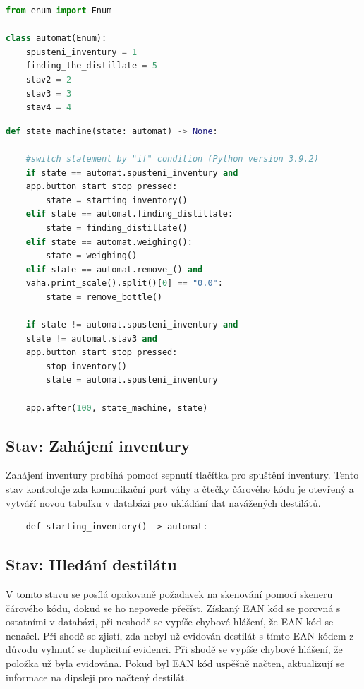 \begin{lstlisting}[language=Python, caption=Hlavní okno, frame=single]
from enum import Enum

class automat(Enum):
    spusteni_inventury = 1
    finding_the_distillate = 5
    stav2 = 2
    stav3 = 3
    stav4 = 4
\end{lstlisting}

\newpage

\begin{lstlisting}[language=Python, caption=Hlavní okno, frame=single]
def state_machine(state: automat) -> None:
    
    #switch statement by "if" condition (Python version 3.9.2)
    if state == automat.spusteni_inventury and
    app.button_start_stop_pressed:
        state = starting_inventory()
    elif state == automat.finding_distillate:
        state = finding_distillate()
    elif state == automat.weighing():
        state = weighing()
    elif state == automat.remove_() and 
    vaha.print_scale().split()[0] == "0.0":
        state = remove_bottle()

    if state != automat.spusteni_inventury and 
    state != automat.stav3 and 
    app.button_start_stop_pressed:
        stop_inventory()
        state = automat.spusteni_inventury

    app.after(100, state_machine, state)
\end{lstlisting}

\subsection{Stav: Zahájení inventury}
Zahájení inventury probíhá pomocí sepnutí tlačítka pro spuštění inventury. Tento stav kontroluje zda komunikační port váhy a čtečky čárového kódu je otevřený a vytváří novou tabulku v databázi pro ukládání dat navážených destilátů.

\begin{lstlisting}
    def starting_inventory() -> automat:
\end{lstlisting}

\newpage
\subsection{Stav: Hledání destilátu}

V tomto stavu se posílá opakovaně požadavek na skenování pomocí skeneru čárového kódu, dokud se ho nepovede přečíst. Získaný EAN kód se porovná s ostatními v databázi, při neshodě se vypíše chybové hlášení, že EAN kód se nenašel. Při shodě se zjistí, zda nebyl už evidován destilát s tímto EAN kódem z důvodu vyhnutí se duplicitní evidenci. Při shodě se vypíše chybové hlášení, že položka už byla evidována. Pokud byl EAN kód uspěšně načten, aktualizují se informace na dipsleji pro načtený destilát.

